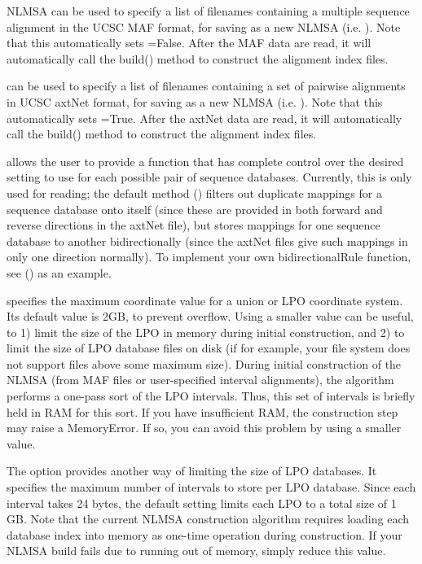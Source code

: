 \documentclass{howto}
\begin{document}
\begin{funcdesc}{NLMSA}
   can be used to specify a list of
  filenames containing a multiple sequence alignment in the UCSC MAF format,
  for saving as a new NLMSA (i.e. ).
  Note that this automatically sets =False.  After the MAF
  data are read, it will automatically call the build() method to construct
  the alignment index files.

   can be used to specify a list of
  filenames containing a set of pairwise alignments in UCSC axtNet format,
  for saving as a new NLMSA (i.e. ).
  Note that this automatically sets =True.  After the axtNet
  data are read, it will automatically call the build() method to construct
  the alignment index files.

   allows the user to provide a function that has
  complete control over the desired  setting to use for
  each possible pair of sequence databases.  Currently, this is only used
  for  reading; the default method ()
  filters out duplicate mappings for a sequence database onto itself
  (since these are provided in both forward and reverse directions in the axtNet
  file), but stores mappings for one sequence database to another 
  bidirectionally (since the axtNet files give such mappings in only one direction
  normally).  To implement your own bidirectionalRule function, see
  () as an example.

   specifies the maximum coordinate
  value for a union or LPO coordinate system.  Its default value is 2GB, to prevent  overflow.
  Using a smaller value can be useful, to 1) limit the size of the LPO in memory
  during initial construction, and 2) to limit the size of LPO database files on disk
  (if for example, your file system does not support files above some maximum size).
  During initial construction of the NLMSA (from MAF files or user-specified interval
  alignments), the algorithm performs a one-pass sort of the LPO intervals.  Thus,
  this set of intervals is briefly held in RAM for this sort.  If you have insufficient
  RAM, the construction step may raise a MemoryError.  If so, you can avoid this problem
  by using a smaller  value.

  The  option provides another way of limiting the size of LPO
  databases.  It specifies the maximum number of intervals to store per LPO database.
  Since each interval takes 24 bytes, the default setting limits each LPO to
  a total size of 1 GB.  Note that the current NLMSA construction algorithm
  requires loading each database index into memory as one-time operation
  during construction.  If your NLMSA build fails due to running out of memory,
  simply reduce this value.


\end{funcdesc}
\end{document}
